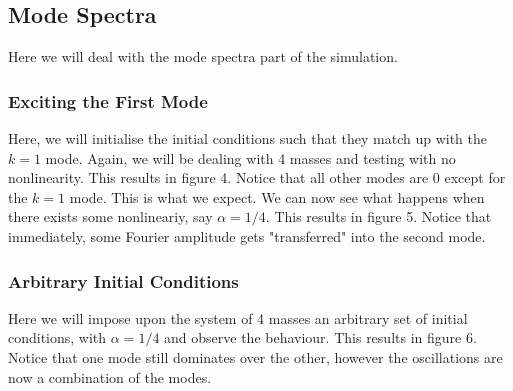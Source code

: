 \documentclass{article}
\begin{document}
\subsection{Mode Spectra}
Here we will deal with the mode spectra part of the simulation.
\subsubsection{Exciting the First Mode}
Here, we will initialise the initial 
conditions such that they match up with the $k=1$ mode. 
Again, we will be dealing with 4 masses and testing with no nonlinearity. This results in 
figure 4. Notice that all other modes are 0 except for the $k=1$ mode. This is what we expect. 
We can now see what happens when there exists some nonlineariy, say $\alpha=1/4$. This results in 
figure 5. Notice that immediately, some Fourier amplitude gets "transferred" into the second mode. 
\subsubsection{Arbitrary Initial Conditions}
Here we will impose upon the system of 4 masses an arbitrary set of initial conditions, with $\alpha=1/4$ and 
observe the behaviour. This results in figure 6. Notice that one mode still dominates over the other, however 
the oscillations are now a combination of the modes.
\end{document}
